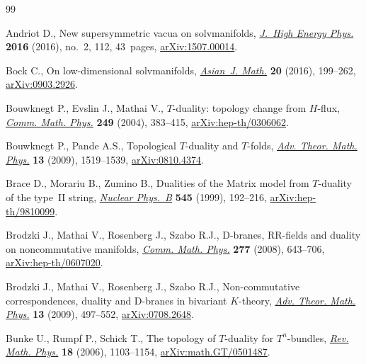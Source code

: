 \begin{thebibliography}{99}
\footnotesize\itemsep=0pt

Andriot D., New supersymmetric vacua on solvmanifolds, \href{https://doi.org/10.1007/JHEP02(2016)112}{\textit{J.~High Energy
 Phys.}} \textbf{2016} (2016), no.~2, 112, 43~pages, \href{https://arxiv.org/abs/1507.00014}{arXiv:1507.00014}.

Bock C., On low-dimensional solvmanifolds, \href{https://doi.org/10.4310/AJM.2016.v20.n2.a1}{\textit{Asian~J. Math.}} \textbf{20}
 (2016), 199--262, \href{https://arxiv.org/abs/0903.2926}{arXiv:0903.2926}.

Bouwknegt P., Evslin J., Mathai V., {$T$}-duality: topology change from
 {$H$}-flux, \href{https://doi.org/10.1007/s00220-004-1115-6}{\textit{Comm. Math. Phys.}} \textbf{249} (2004), 383--415,
 \href{https://arxiv.org/abs/hep-th/0306062}{arXiv:hep-th/0306062}.

Bouwknegt P., Pande A.S., Topological {$T$}-duality and {$T$}-folds,
 \href{https://doi.org/10.4310/ATMP.2009.v13.n5.a6}{\textit{Adv. Theor. Math. Phys.}} \textbf{13} (2009), 1519--1539,
 \href{https://arxiv.org/abs/0810.4374}{arXiv:0810.4374}.

Brace D., Morariu B., Zumino B., Dualities of the {M}atrix model from
 {$T$}-duality of the type~{II} string, \href{https://doi.org/10.1016/S0550-3213(99)00009-7}{\textit{Nuclear Phys.~B}} \textbf{545}
 (1999), 192--216, \href{https://arxiv.org/abs/hep-th/9810099}{arXiv:hep-th/9810099}.

Brodzki J., Mathai V., Rosenberg J., Szabo R.J., D-branes, {RR}-fields and
 duality on noncommutative manifolds, \href{https://doi.org/10.1007/s00220-007-0396-y}{\textit{Comm. Math. Phys.}} \textbf{277}
 (2008), 643--706, \href{https://arxiv.org/abs/hep-th/0607020}{arXiv:hep-th/0607020}.

Brodzki J., Mathai V., Rosenberg J., Szabo R.J., Non-commutative
 correspondences, duality and {D}-branes in bivariant {$K$}-theory,
 \href{https://doi.org/10.4310/ATMP.2009.v13.n2.a4}{\textit{Adv. Theor. Math. Phys.}} \textbf{13} (2009), 497--552,
 \href{https://arxiv.org/abs/0708.2648}{arXiv:0708.2648}.

Bunke U., Rumpf P., Schick T., The topology of {$T$}-duality for
 {$T^n$}-bundles, \href{https://doi.org/10.1142/S0129055X06002875}{\textit{Rev. Math. Phys.}} \textbf{18} (2006), 1103--1154,
 \href{https://arxiv.org/abs/math.GT/0501487}{arXiv:math.GT/0501487}.


\end{thebibliography}

